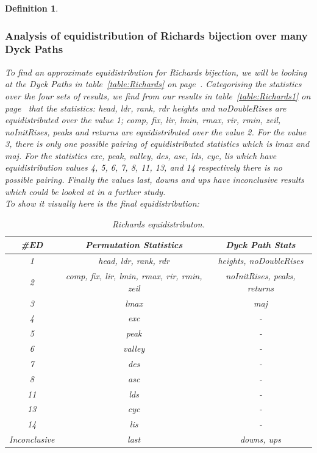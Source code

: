 \documentclass[12pt]{article}
\newtheorem{definition}{Definition}
\begin{document}
\begin{definition}
\subsubsection{Analysis of equidistribution of Richards bijection over many Dyck Paths}
To find an approximate equidistribution for Richards bijection, we will be looking at the Dyck Paths in table~\ref{table:Richards} on page~\pageref{table:Richards}. Categorising the statistics over the four sets of results, we find from our results in table~\ref{table:Richards1} on page~\pageref{table:Richards1} that the statistics: head, ldr, rank, rdr heights and noDoubleRises are equidistributed over the value 1; comp, fix, lir, lmin, rmax, rir, rmin, zeil, noInitRises, peaks and returns are equidistributed over the value 2. For the value 3, there is only one possible pairing of equidistributed statistics which is lmax and maj. For the statistics exc, peak, valley, des, asc, lds, cyc, lis which have equidistribution values 4, 5, 6, 7, 8, 11, 13, and 14 respectively there is no possible pairing. Finally the values last, downs and ups have inconclusive results which could be looked at in a further study.\\
To show it visually here is the final equidistribution:
\begin{table}[H]
\caption{Richards equidistributon.}
\begin{tabular}{c | c | c}
\hline\hline
\#ED & Permutation Statistics & Dyck Path Stats\\ [0.5ex]
\hline
1 & head, ldr, rank, rdr & heights, noDoubleRises  \\
\hline
2 & comp, fix, lir, lmin, rmax, rir, rmin, zeil & noInitRises, peaks, returns\\
\hline
3 & lmax & maj\\
\hline
4 & exc & - \\
\hline
5 & peak & - \\
\hline
6 & valley & - \\
\hline
7 & des & - \\
\hline
8 & asc & - \\
\hline
11 & lds & - \\
\hline
13 & cyc & - \\
\hline
14 & lis & - \\
\hline
Inconclusive & last & downs, ups \\
\hline
\end{tabular}
\label{table:FinalEDRichards}
\end{table}


\end{definition}
\end{document}
